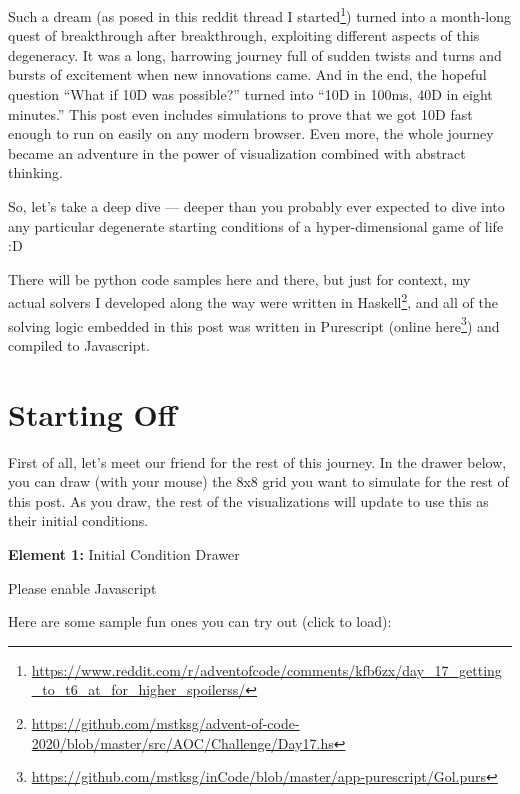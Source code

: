 \documentclass[]{article}
\renewcommand{\href}[2]{#2\footnote{\url{#1}}}
\begin{document}
Such a dream (as posed in
\href{https://www.reddit.com/r/adventofcode/comments/kfb6zx/day_17_getting_to_t6_at_for_higher_spoilerss/}{this
reddit thread I started}) turned into a month-long quest of breakthrough after
breakthrough, exploiting different aspects of this degeneracy. It was a long,
harrowing journey full of sudden twists and turns and bursts of excitement when
new innovations came. And in the end, the hopeful question ``What if 10D was
possible?'' turned into ``10D in 100ms, 40D in eight minutes.'' This post even
includes simulations to prove that we got 10D fast enough to run on easily on
any modern browser. Even more, the whole journey became an adventure in the
power of visualization combined with abstract thinking.

So, let's take a deep dive --- deeper than you probably ever expected to dive
into any particular degenerate starting conditions of a hyper-dimensional game
of life :D

There will be python code samples here and there, but just for context, my
actual solvers I developed along the way were
\href{https://github.com/mstksg/advent-of-code-2020/blob/master/src/AOC/Challenge/Day17.hs}{written
in Haskell}, and all of the solving logic embedded in this post was written in
Purescript
(\href{https://github.com/mstksg/inCode/blob/master/app-purescript/Gol.purs}{online
here}) and compiled to Javascript.

\hypertarget{starting-off}{%
\section{Starting Off}\label{starting-off}}

First of all, let's meet our friend for the rest of this journey. In the drawer
below, you can draw (with your mouse) the 8x8 grid you want to simulate for the
rest of this post. As you draw, the rest of the visualizations will update to
use this as their initial conditions.

\leavevmode\hypertarget{golDrawer}{}%
\textbf{Element 1:} Initial Condition Drawer

\leavevmode\hypertarget{golDrawerCont}{}%
Please enable Javascript

Here are some sample fun ones you can try out (click to load):
\end{document}
